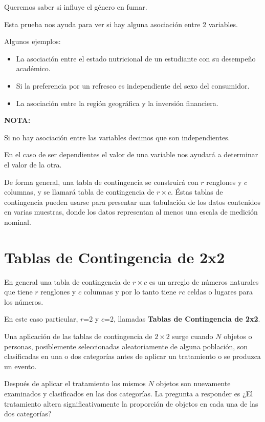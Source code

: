 \documentclass[
  a4paper,
  oneside,
  openany]{book}
\begin{document}
Queremos saber si influye el género en fumar.

Esta prueba nos ayuda para ver si hay alguna asociación entre 2 variables.

Algunos ejemplos:

\begin{itemize}
\item
  La asociación entre el estado nutricional de un estudiante con su desempeño académico.
\item
  Si la preferencia por un refresco es independiente del sexo del consumidor.
\item
  La asociación entre la región geográfica y la inversión financiera.
\end{itemize}

\textbf{NOTA:}

Si no hay asociación entre las variables decimos que son independientes.

En el caso de ser dependientes el valor de una variable nos ayudará a determinar el valor de la otra.

De forma general, una tabla de contingencia se construirá con \(r\) renglones y \(c\) columnas, y se llamará tabla de contingencia de \(r\times c\). Éstas tablas de contingencia pueden usarse para presentar una tabulación de los datos contenidos en varias muestras, donde los datos representan al menos una escala de medición nominal.

\hypertarget{tablas-de-contingencia-de-2x2}{%
\chapter{Tablas de Contingencia de 2x2}\label{tablas-de-contingencia-de-2x2}}

En general una tabla de contingencia de \(r \times c\) es un arreglo de números naturales que tiene \(r\) renglones y \(c\) columnas y por lo tanto tiene \(rc\) celdas o lugares para los números.

En este caso particular, \(r\)=2 y \(c\)=2, llamadas \textbf{Tablas de Contingencia de 2x2}.

Una aplicación de las tablas de contingencia de \(2 \times 2\) surge cuando \(N\) objetos o personas, posiblemente seleccionadas aleatoriamente de alguna población, son clasificadas en una o dos categorías antes de aplicar un tratamiento o se produzca un evento.

Después de aplicar el tratamiento los mismos \(N\) objetos son nuevamente examinados y clasificados en las dos categorías. La pregunta a responder es ¿El tratamiento altera significativamente la proporción de objetos en cada una de las dos categorías?
\end{document}
